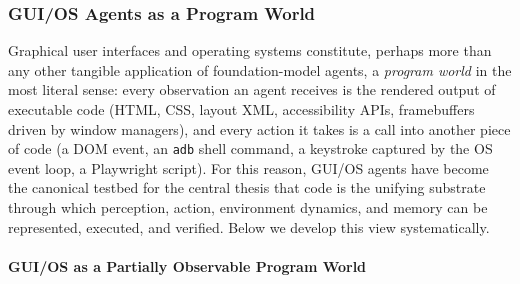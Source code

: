 \documentclass{llmxive}
\begin{document}
\subsubsection{GUI/OS Agents as a Program World}

Graphical user interfaces and operating systems constitute, perhaps more than any other tangible application of foundation-model agents, a \textit{program world} in the most literal sense: every observation an agent receives is the rendered output of executable code (HTML, CSS, layout XML, accessibility APIs, framebuffers driven by window managers), and every action it takes is a call into another piece of code (a DOM event, an \texttt{adb} shell command, a keystroke captured by the OS event loop, a Playwright script). For this reason, GUI/OS agents have become the canonical testbed for the central thesis that code is the unifying substrate through which perception, action, environment dynamics, and memory can be represented, executed, and verified. Below we develop this view systematically.


\paragraph{GUI/OS as a Partially Observable Program World}
\end{document}
